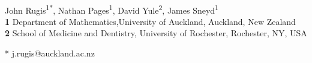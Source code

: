 \documentclass[10pt,letterpaper]{article}
\date{}
\begin{document}
\vspace*{0.2in}

\begin{flushleft}
{\Large
\textbf{}
}
\newline
\\
John Rugis\textsuperscript{1*},
Nathan Pages\textsuperscript{1},
David Yule\textsuperscript{2},
James Sneyd\textsuperscript{1}
\\
\bigskip
\textbf{1} Department of Mathematics,University of Auckland, Auckland, New Zealand
\\
\textbf{2} School of Medicine and Dentistry, University of Rochester, Rochester, NY, USA
\\

\bigskip

% 
%



* j.rugis@auckland.ac.nz
\end{flushleft}

\end{document}
